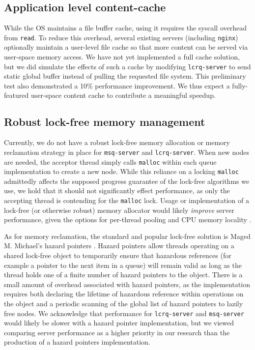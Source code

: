 \documentclass[twoside,10pt]{article}
\begin{document}
\begin{multicols}{2}
\subsection{Application level content-cache}
\label{app-cache}
While the OS maintains a file buffer cache, using it requires the
syscall overhead from \verb+read+. To reduce this overhead, several
existing servers (including \verb+nginx+) optionally maintain a
user-level file cache so that more content can be served via
user-space memory access. We have not yet implemented a full cache
solution, but we did simulate the effects of such a cache by modifying
\verb+lcrq-server+ to send static global buffer instead of pulling the
requested file system. This preliminary test also demonstrated a 10\%
performance improvement. We thus expect a fully-featured user-space
content cache to contribute a meaningful speedup.

\subsection{Robust lock-free memory management}

Currently, we do not have a robust lock-free memory allocation or
memory reclamation strategy in place for \verb+msq-server+ and
\verb+lcrq-server+. When new nodes are needed, the acceptor thread
simply calls \verb+malloc+ within each queue implementation to create
a new node. While this reliance on a locking \verb+malloc+ admittedly
affects the supposed progress guarantee of the lock-free algorithms we
use, we hold that it should not significantly effect performance, as
only the accepting thread is contending for the \verb+malloc+
lock. Usage or implementation of a lock-free (or otherwise robust)
memory allocator would likely \emph{improve} server performance, given the
options for per-thread pooling and CPU memory locality
\cite{hart2007performance}.

As for memory reclamation, the standard and popular lock-free solution
is Maged M. Michael's hazard pointers \cite{michael2004hazard}. Hazard
pointers allow threads operating on a shared lock-free object to
temporarily ensure that hazardous references (for example a pointer to
the next item in a queue) will remain valid as long as the thread
holds one of a finite number of hazard pointers to the object. There
is a small amount of overhead associated with hazard pointers, as the
implementation requires both declaring the lifetime of hazardous
reference within operations on the object and a periodic scanning of
the global list of hazard pointers to lazily free nodes. We
acknowledge that performance for \verb+lcrq-server+ and
\verb+msq-server+ would likely be slower with a hazard pointer
implementation, but we viewed comparing server performance as a higher
priority in our research than the production of a hazard pointers
implementation.


\end{multicols}
\end{document}
